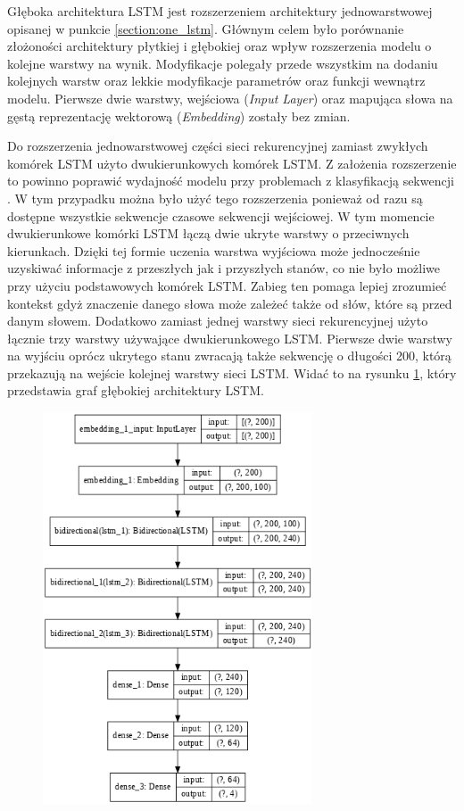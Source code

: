 Głęboka architektura LSTM jest rozszerzeniem architektury jednowarstwowej opisanej w punkcie \ref{section:one_lstm}. Głównym celem było porównanie złożoności architektury płytkiej i głębokiej oraz wpływ rozszerzenia modelu o kolejne warstwy na wynik. Modyfikacje polegały przede wszystkim na dodaniu kolejnych warstw oraz lekkie modyfikacje parametrów oraz funkcji wewnątrz modelu. Pierwsze dwie warstwy, wejściowa (\textit{Input Layer}) oraz mapująca słowa na gęstą reprezentację wektorową (\textit{Embedding}) zostały bez zmian.

Do rozszerzenia jednowarstwowej części sieci rekurencyjnej zamiast zwykłych komórek LSTM użyto dwukierunkowych komórek LSTM. Z założenia rozszerzenie to powinno poprawić wydajność modelu przy problemach z klasyfikacją sekwencji \cite{ding2018densely}. W tym przypadku można było użyć tego rozszerzenia ponieważ od razu są dostępne wszystkie sekwencje czasowe sekwencji wejściowej. W tym momencie dwukierunkowe komórki LSTM łączą dwie ukryte warstwy o przeciwnych kierunkach. Dzięki tej formie uczenia warstwa wyjściowa może jednocześnie uzyskiwać informacje z przeszłych jak i przyszłych stanów, co nie było możliwe przy użyciu podstawowych komórek LSTM. Zabieg ten pomaga lepiej zrozumieć kontekst gdyż znaczenie danego słowa może zależeć także od słów, które są przed danym słowem. Dodatkowo zamiast jednej warstwy sieci rekurencyjnej użyto łącznie trzy warstwy używające dwukierunkowego LSTM. Pierwsze dwie warstwy na wyjściu oprócz ukrytego stanu zwracają także sekwencję o długości 200, którą przekazują na wejście kolejnej warstwy sieci LSTM. Widać to na rysunku \ref{rys:lstm_deep_graph}, który przedstawia graf głębokiej architektury LSTM.

\begin{figure}[t]
\centering\includegraphics[width=8cm]{figures/reports/lstm_deep_graph.png}
\label{rys:lstm_deep_graph}
\end{figure}

